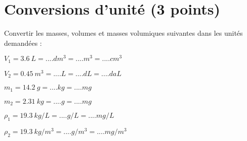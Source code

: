 \section{Conversions d'unité (3 points)}\label{ex:convert}

Convertir les masses, volumes et masses volumiques suivantes dans les unités demandées :
\begin{questions}
	\begin{multicols}{2}
			
		\question[\half] $V_1 = \num{3.6}\  L = .... dm^3 = .... m^3 = ....cm^3 $
		
		\question[\half] $V_2 = \num{0.45}\  m^3 = .... L = .... dL = ....daL $
		
		\question[\half] $m_1 = \num{14.2}\  g = .... kg = .... mg $
		
		\question[\half] $m_2 = \num{2.31}\  kg = .... g = .... mg $
		
		\question[\half] $\rho _1 = \num{19.3}\  kg/L = .... g/L = .... mg/L $
		
		\question[\half] $\rho _2 = \num{19.3}\  kg/m^3 = .... g/m^3 = .... mg/m^3 $
	\end{multicols}
\end{questions}
